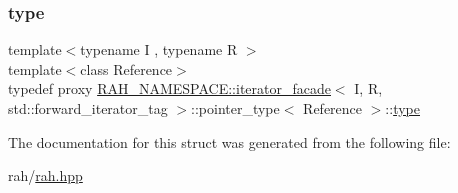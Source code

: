 \subsubsection{\texorpdfstring{type}{type}}
{\footnotesize\ttfamily template$<$typename I , typename R $>$ \\
template$<$class Reference$>$ \\
typedef proxy \mbox{\hyperlink{struct_r_a_h___n_a_m_e_s_p_a_c_e_1_1iterator__facade}{R\+A\+H\+\_\+\+N\+A\+M\+E\+S\+P\+A\+C\+E\+::iterator\+\_\+facade}}$<$ I, R, std\+::forward\+\_\+iterator\+\_\+tag $>$\+::pointer\+\_\+type$<$ Reference $>$\+::\mbox{\hyperlink{struct_r_a_h___n_a_m_e_s_p_a_c_e_1_1iterator__facade_3_01_i_00_01_r_00_01std_1_1forward__iterator__tag_01_4_1_1pointer__type_ac9b6d863dcd7e0b5b89830a56c4c34f8}{type}}}



The documentation for this struct was generated from the following file\+:\begin{DoxyCompactItemize}
\item 
rah/\mbox{\hyperlink{rah_8hpp}{rah.\+hpp}}\end{DoxyCompactItemize}
